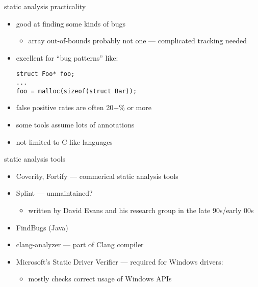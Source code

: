 \begin{frame}[fragile,label=practic]{static analysis practicality}
    \begin{itemize}
    \item good at finding some kinds of bugs
        \begin{itemize}
        \item array out-of-bounds probably not one --- complicated tracking needed
        \end{itemize}
    \item excellent for ``bug patterns'' like:
\begin{lstlisting}
struct Foo* foo;
...
foo = malloc(sizeof(struct Bar));
\end{lstlisting}
    \item false positive rates are often 20+\% or more
    \item some tools assume lots of annotations
    \item not limited to C-like languages
    \end{itemize}
\end{frame}

\begin{frame}{static analysis tools}
    \begin{itemize}
    \item Coverity, Fortify --- commerical static analysis tools
    \item Splint --- unmaintained?
        \begin{itemize}
            \item written by David Evans and his research group in the late 90s/early 00s
        \end{itemize}
    \item FindBugs (Java)
    \item clang-analyzer --- part of Clang compiler
    \item Microsoft's Static Driver Verifier  --- required for Windows drivers:
        \begin{itemize}
            \item mostly checks correct usage of Windows APIs
        \end{itemize}
    \end{itemize}
\end{frame}

